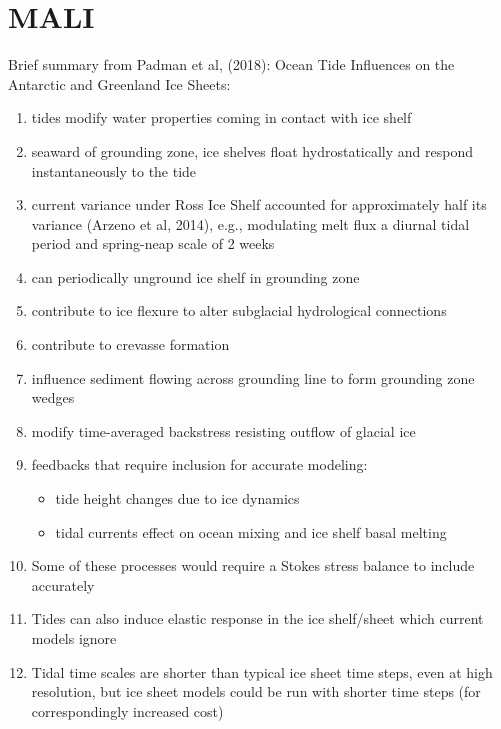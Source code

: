 \section{MALI}
Brief summary from  Padman et al, (2018): Ocean Tide Influences on the Antarctic and Greenland Ice Sheets:
\begin{enumerate}
\item tides modify water properties coming in contact with ice shelf
\item seaward of grounding zone, ice shelves float hydrostatically and respond instantaneously to the tide
\item current variance under Ross Ice Shelf accounted for approximately half its variance (Arzeno et al, 2014), e.g., modulating melt flux a diurnal tidal period and spring-neap scale of 2 weeks
\item can periodically unground ice shelf in grounding zone
\item contribute to ice flexure to alter subglacial hydrological connections
\item contribute to crevasse formation 
\item influence sediment flowing across grounding line to form grounding zone wedges
\item modify time-averaged backstress resisting outflow of glacial ice
\item feedbacks that require inclusion for accurate modeling:
\begin{itemize}
\item tide height changes due to ice dynamics
\item tidal currents effect on ocean mixing and ice shelf basal melting
\end{itemize}
\item Some of these processes would require a Stokes stress balance to include accurately
\item Tides can also induce elastic response in the ice shelf/sheet which current models ignore
\item Tidal time scales are shorter than typical ice sheet time steps, even at high resolution, but ice sheet models could be run with shorter time steps (for correspondingly increased cost)
\end{enumerate}


